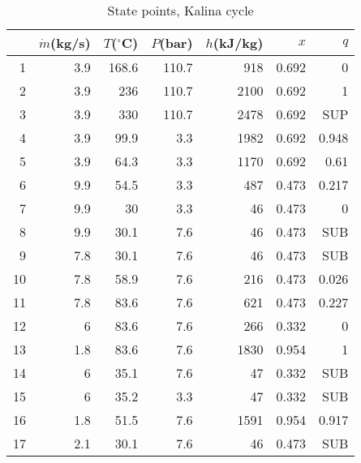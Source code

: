 \documentclass[review,3p]{elsarticle}
\begin{document}
\begin{table}[H]
\centering
\caption{State points, Kalina cycle}
%
\scriptsize


\begin{tabular}{rrrrrrr}
\toprule
 & $\dot{m}$(kg/s)&  $T$($^{\circ}$C) &  $P$(bar) &  $h$(kJ/kg) & $x$ &  $q$ \\
 \midrule

 1 & 3.9 & 168.6 & 110.7 & 918 & 0.692 &  0 \\

 2 & 3.9 & 236 & 110.7 & 2100 & 0.692 &  1 \\

 3 & 3.9 & 330 & 110.7 & 2478 & 0.692 & SUP \\

 4 & 3.9 & 99.9 & 3.3 & 1982 & 0.692 & 0.948 \\

 5 & 3.9 & 64.3 & 3.3 & 1170 & 0.692 & 0.61 \\

 6 & 9.9 & 54.5 & 3.3 & 487 & 0.473 & 0.217 \\

 7 & 9.9 & 30 & 3.3 & 46 & 0.473 &  0 \\

 8 & 9.9 & 30.1 & 7.6 & 46 & 0.473 & SUB \\

 9 & 7.8 & 30.1 & 7.6 & 46 & 0.473 & SUB \\

10 & 7.8 & 58.9 & 7.6 & 216 & 0.473 & 0.026 \\

11 & 7.8 & 83.6 & 7.6 & 621 & 0.473 & 0.227 \\

12 &  6 & 83.6 & 7.6 & 266 & 0.332 &  0 \\

13 & 1.8 & 83.6 & 7.6 & 1830 & 0.954 &  1 \\

14 &  6 & 35.1 & 7.6 & 47 & 0.332 & SUB \\

15 &  6 & 35.2 & 3.3 & 47 & 0.332 & SUB \\

16 & 1.8 & 51.5 & 7.6 & 1591 & 0.954 & 0.917 \\

17 & 2.1 & 30.1 & 7.6 & 46 & 0.473 & SUB \\


\end{tabular}
\end{table}
\end{document}
